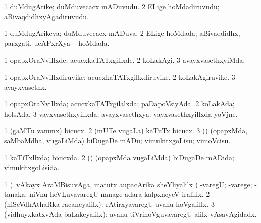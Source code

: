 {{\bentry
{} 
\gl{\nA}
\expl{}
\bmng
\bnum
\num{1} duMdugArike; duMduvecacx mADuvudu. 
\num{2} ELige hoMdadiruvudu; aBivaqdidhxyAgadiruvudu. 
\enum
\emng
\eentry

\bentry
{} 
\gl{\gu}
\expl{}
\bmng
\bnum
\num{1} duMdugArikeya; duMduvecacx mADuva. 
\num{2} ELige hoMdada; aBivaqdidhx, parxgati, ucAPxrXya -- hoMdada. 
\enum
\emng
\eentry

\bentry
{} 
\gl{\sakirx}
\expl{}
\bmng
{} 
\emng
\eentry

\bentry
{} 
\gl{\kirxvi}
\bmng
\bnum
\num{1} opapxOraNvillxde; acucxkaTATxgillxde. 
\num{2} koLakAgi. 
\num{3} avayxvasethxyiMda. 
\enum
\emng
\eentry

\bentry
{} 
\gl{\nA}
\expl{}
\bmng
\bnum
\num{1} opapxOraNvillxdiruvike; acucxkaTATxgillxdiruvike. 
\num{2} koLakAgiruvike. 
\num{3} avayxvasethx. 
\enum
\emng
\eentry

\bentry
{} 
\gl{\gu}
\bmng
\bnum
\num{1} opapxOraNvillxda; acucxkaTATxgilalxda; paDapoVsiyAda. 
\num{2} koLakAda; holsAda. 
\num{3} vayxvasethxyillxda; avayxvasethxya:  vayxvasethxyillxda yoVjne. 
\enum
\emng
\eentry

\bentry
{} 
\gl{\akirx}
\bmng
\bnum
\num{1} (gaMTu \mo vanunx) bicucx. 
\num{2} (mUTe \mo vugaLa) kaTuTx bicucx. 
\num{3} (\rUpa) (opapxMda, saMbaMdha, \mo vugaLiMda) biDugaDe mADu; vimukitxgoLisu; vimoVcisu. 
\enum
\emng
\eentry

\bentry
{} 
\gl{\gu}
\expl{}
\bmng
\bnum
\num{1} kaTiTxllxda; bicicxda. 
\num{2} (\rUpa) (opapxMda \mo vugaLiMda) biDugaDe mADida; vimukitxgoLisida. 
\enum
\emng
\eentry

\bentry
{} 
\gl{\upa}
\expl{}
\bmng
\bnum
\num{1} (\kanmu\ vAkayx AraMBisuvAga, matutx aupacArika sheYliyalilx \parx) -varegU; -varege; -tanaka:  niVnu heVLuvavaregU nanage adara kalpxneyeV iralillx. 
\num{2} (niSeVdhAthaRka racaneyalilx):  rAtirxyavaregU avanu hoVgalillx. 
\num{3} (vidhuyxkatxvAda baLakeyalilx):  avanu tiVrihoVguvavaregU alilx vAsavAgidadx. 
\enum
\emng
\eentry

}}
